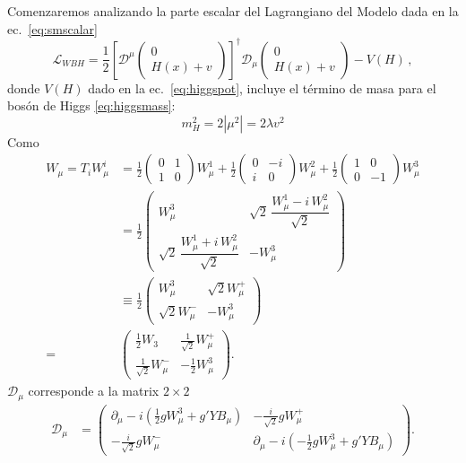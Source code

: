 \begin{frame}
Comenzaremos analizando la parte escalar del Lagrangiano del Modelo dada en la ec.~\eqref{eq:smscalar}
\begin{equation}
  \mathcal{L}_{WBH}=\frac{1}{2}\left[\mathcal{D}^\mu \begin{pmatrix}
    0\\
    H(x)+v
  \end{pmatrix}\right]^\dagger\mathcal{D}_\mu\begin{pmatrix}
    0\\
    H(x)+v
  \end{pmatrix}-V(H)\,,
\end{equation}
donde $V(H)$ dado en la ec.~\eqref{eq:higgspot}, incluye el término de masa para el bosón de Higgs \eqref{eq:higgsmass}:
\begin{equation}
  m_H^2=2\left|\mu^2\right|=2\lambda v^2
\end{equation}
Como
\begin{align}
      W_\mu=T_i W^{i}_\mu&=
  \frac{1}{2}\begin{pmatrix}
    0&1\\
    1&0
  \end{pmatrix}W^1_\mu+
  \frac{1}{2}\begin{pmatrix}
    0&-i\\
    i&0
  \end{pmatrix}W^2_\mu+
  \frac{1}{2}\begin{pmatrix}
    1&0\\
    0&-1
  \end{pmatrix}W^3_\mu\nonumber\\
  &=
  \frac{1}{2}\begin{pmatrix}
    W^3_\mu                                  &\sqrt{2}\,\dfrac{W^1_\mu-i\,W^2_\mu}{\sqrt{2}}\\
    \sqrt{2}\,\dfrac{W^1_\mu+i\,W^2_\mu}{\sqrt{2}} &-W^3_\mu
  \end{pmatrix}\nonumber\\
  &\equiv
  \frac{1}{2}\begin{pmatrix}
    W^3_\mu&\sqrt{2}W^+_\mu\\
    \sqrt{2}W^-_\mu&-W^3_\mu
  \end{pmatrix}\nonumber\\
=&\begin{pmatrix}
    \frac{1}{2}W_3&\frac{1}{\sqrt{2}}W^+_\mu\\
    \frac{1}{\sqrt{2}}W^-_\mu&-\frac{1}{2}W^3_\mu
  \end{pmatrix}.
\end{align}
$\mathcal{D}_\mu$ corresponde a la matrix $2\times  2$
\begin{align}
 \mathcal{D}_\mu &=  \begin{pmatrix}
    \partial_\mu-i\left(\frac{1}{2}g W^3_\mu+g' Y B_\mu\right)&-\frac{i}{\sqrt{2}}g W^+_\mu\\
    -\frac{i}{\sqrt{2}}g W^-_\mu&\partial_\mu-i\left(-\frac{1}{2}g W^3_\mu+g'Y B_\mu\right)
  \end{pmatrix}.
\end{align}


\end{frame}
